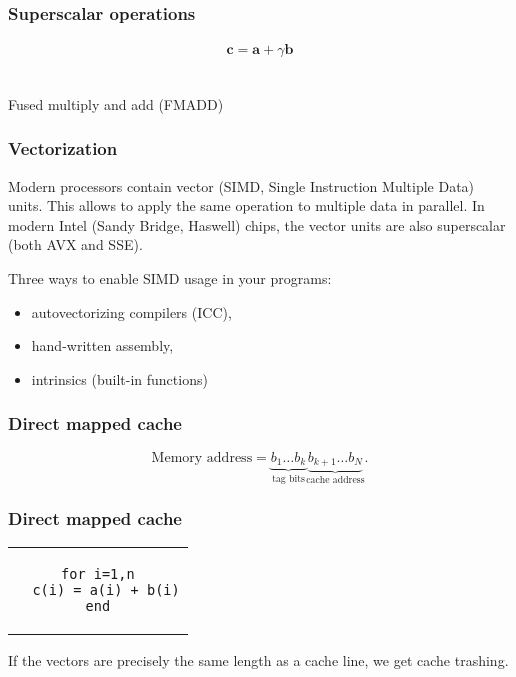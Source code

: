 \begin{frame}
  \frametitle{Superscalar operations}
  \begin{align*}
    \bm c = \bm a + \gamma \bm b
  \end{align*}

  \begin{center}
     \\
    Fused multiply and add (FMADD)
  \end{center}
\end{frame}

\begin{frame}
  \frametitle{Vectorization}
  Modern processors contain vector (SIMD, Single Instruction Multiple Data)
  units. This allows to apply the same operation to multiple data in parallel.
  In modern Intel (Sandy Bridge, Haswell) chips, the vector units are also
  superscalar (both AVX and SSE).

  Three ways to enable SIMD usage in your programs:
  \begin{itemize}
  \item autovectorizing compilers (ICC),
  \item hand-written assembly,
  \item intrinsics (built-in functions)
  \end{itemize}
\end{frame}

\begin{frame}
  \frametitle{Direct mapped cache}
  \begin{center}
    
  \end{center}
  \[
    \text{Memory address} =
    \underbrace{b_1 \ldots b_k}_{\text{tag bits}}
    \underbrace{b_{k+1} \ldots b_{N}}_{\text{cache address}}.
  \]
\end{frame}

\begin{frame}[fragile]
  \frametitle{Direct mapped cache}
  \begin{center}
    \begin{tabular}{c}
\begin{lstlisting}[style=fortran]
for i=1,n
  c(i) = a(i) + b(i)
end
\end{lstlisting}
    \end{tabular}
  \end{center}

  If the vectors are precisely the same length as a cache line, we get cache
  trashing.

  \begin{center}
    
  \end{center}
\end{frame}

